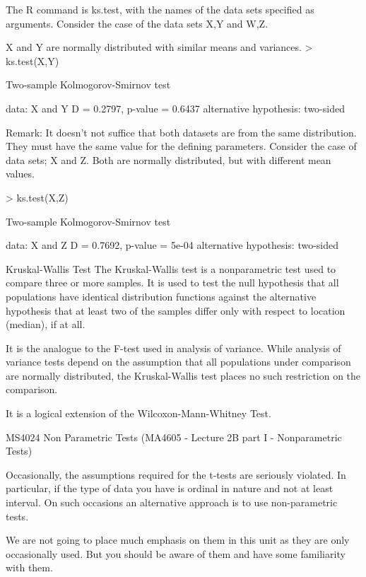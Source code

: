 The R command is ks.test, with the names of the data sets specified as arguments. Consider the case of the data sets  X,Y and W,Z. 

 

X and Y are normally distributed with similar means and variances. 
> ks.test(X,Y)

        Two-sample Kolmogorov-Smirnov test

data:  X and Y 
D = 0.2797, p-value = 0.6437
alternative hypothesis: two-sided




Remark:  It doesn’t not suffice that both datasets are from the same distribution. They must have the same value for the defining parameters.  Consider the case of data sets; X and Z. Both are normally distributed, but with different mean values. 

> ks.test(X,Z)

        Two-sample Kolmogorov-Smirnov test

data:  X and Z 
D = 0.7692, p-value = 5e-04
alternative hypothesis: two-sided

 Kruskal-Wallis Test
The Kruskal-Wallis test is a nonparametric test used to compare three or more samples. It is used to test the null hypothesis that all populations have identical distribution functions against the alternative hypothesis that at least two of the samples differ only with respect to location (median), if at all.

It is the analogue to the F-test used in analysis of variance. While analysis of variance tests depend on the assumption that all populations under comparison are normally distributed, the Kruskal-Wallis test places no such restriction on the comparison.

It is a logical extension of the Wilcoxon-Mann-Whitney Test.




MS4024 Non Parametric Tests
(MA4605 - Lecture 2B part I - Nonparametric Tests)

Occasionally, the assumptions required for the t-tests are seriously violated. In particular, if the type of data you have is ordinal in nature and not at least interval. On such occasions an alternative approach is to use non-parametric tests. 

We are not going to place much emphasis on them in this unit as they are only occasionally used. But you should be aware of them and have some familiarity with them.

